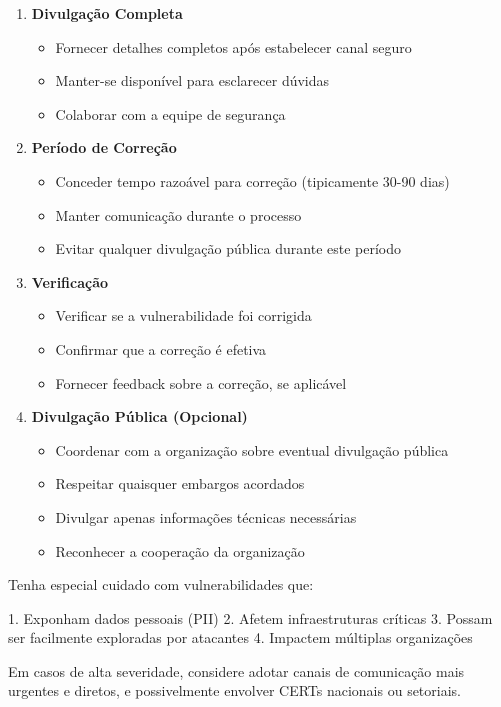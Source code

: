 \documentclass[12pt,a4paper]{book}
\begin{document}
\begin{mdframed}[backgroundcolor=verdeestabilidade!10, roundcorner=10pt, leftmargin=1cm, rightmargin=1cm]
\begin{enumerate}
    \item \textbf{Divulgação Completa}
    \begin{itemize}
        \item Fornecer detalhes completos após estabelecer canal seguro
        \item Manter-se disponível para esclarecer dúvidas
        \item Colaborar com a equipe de segurança
    \end{itemize}
    
    \item \textbf{Período de Correção}
    \begin{itemize}
        \item Conceder tempo razoável para correção (tipicamente 30-90 dias)
        \item Manter comunicação durante o processo
        \item Evitar qualquer divulgação pública durante este período
    \end{itemize}
    
    \item \textbf{Verificação}
    \begin{itemize}
        \item Verificar se a vulnerabilidade foi corrigida
        \item Confirmar que a correção é efetiva
        \item Fornecer feedback sobre a correção, se aplicável
    \end{itemize}
    
    \item \textbf{Divulgação Pública (Opcional)}
    \begin{itemize}
        \item Coordenar com a organização sobre eventual divulgação pública
        \item Respeitar quaisquer embargos acordados
        \item Divulgar apenas informações técnicas necessárias
        \item Reconhecer a cooperação da organização
    \end{itemize}
\end{enumerate}
\end{mdframed}

\begin{alertbox}
Tenha especial cuidado com vulnerabilidades que:

1. Exponham dados pessoais (PII)
2. Afetem infraestruturas críticas
3. Possam ser facilmente exploradas por atacantes
4. Impactem múltiplas organizações

Em casos de alta severidade, considere adotar canais de comunicação mais urgentes e diretos, e possivelmente envolver CERTs nacionais ou setoriais.
\end{alertbox}
\end{document}
